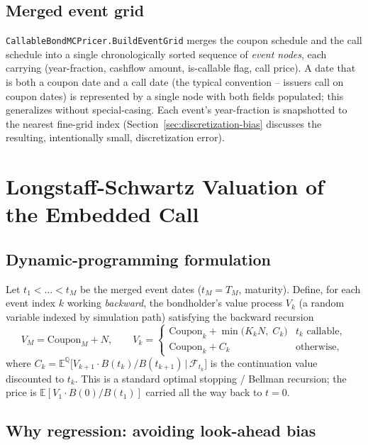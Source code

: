 \documentclass[11pt,a4paper]{article}
\newcommand{\E}{\mathbb{E}}
\newcommand{\Q}{\mathbb{Q}}
\newcommand{\F}{\mathcal{F}}
\newcommand{\coderef}[1]{\texttt{\color{blue!60!black}#1}}
\theoremstyle{definition}
\begin{document}
\subsection{Merged event grid}

\coderef{CallableBondMCPricer.BuildEventGrid} merges the coupon schedule and
the call schedule into a single chronologically sorted sequence of
\emph{event nodes}, each carrying (year-fraction, cashflow amount,
is-callable flag, call price). A date that is both a coupon date and a call
date (the typical convention -- issuers call on coupon dates) is
represented by a single node with both fields populated; this generalizes
without special-casing. Each event's year-fraction is snapshotted to the
nearest fine-grid index (Section~\ref{sec:discretization-bias} discusses the
resulting, intentionally small, discretization error).

\section{Longstaff-Schwartz Valuation of the Embedded Call}
\label{sec:lsm}

\subsection{Dynamic-programming formulation}

Let $t_1<\dots<t_M$ be the merged event dates ($t_M=T_M$, maturity). Define,
for each event index $k$ working \emph{backward}, the bondholder's value
process $V_k$ (a random variable indexed by simulation path) satisfying the
backward recursion
\begin{equation}
  V_M = \text{Coupon}_M + N, \qquad
  V_k = \begin{cases}
    \text{Coupon}_k + \min\bigl(K_kN,\;C_k\bigr) & \text{$t_k$ callable},\\[2pt]
    \text{Coupon}_k + C_k & \text{otherwise},
  \end{cases}
  \label{eq:bellman}
\end{equation}
where $C_k = \E^\Q\bigl[V_{k+1}\cdot B(t_k)/B(t_{k+1})\,\big|\,\F_{t_k}\bigr]$
is the continuation value discounted to $t_k$. This is a standard optimal
stopping / Bellman recursion; the price is $\E[V_1\cdot B(0)/B(t_1)]$
carried all the way back to $t=0$.

\subsection{Why regression: avoiding look-ahead bias}
\end{document}
